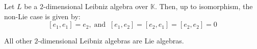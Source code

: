 \documentclass[12pt]{amsart}
\theoremstyle{plain}
\newtheorem{example}[theorem]{Example}
\theoremstyle{definition}
\begin{document}

Let $L$ be a $2$-dimensional Leibniz algebra over $\mathbb{K}$. Then, up to isomorphism, the non-Lie case is given by:
\[
[e_1,e_1] = e_2,\; \text{and} \;\; [e_1,e_2]=[e_2,e_1]=[e_2,e_2]=0
\]

All other $2$-dimensional Leibniz algebras are Lie algebras.

\vspace{5mm}
\end{document}
